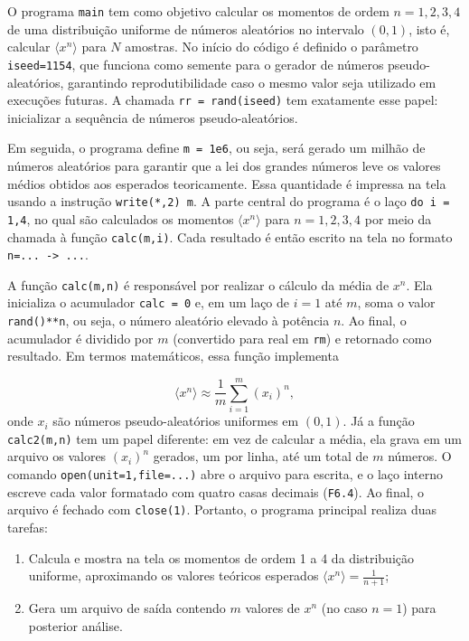 O programa \texttt{main} tem como objetivo calcular os momentos de ordem $n=1,2,3,4$ 
de uma distribuição uniforme de números aleatórios no intervalo $(0,1)$, 
isto é, calcular $\langle x^n \rangle$ para $N$ amostras.  
No início do código é definido o parâmetro \texttt{iseed=1154}, 
que funciona como semente para o gerador de números pseudo-aleatórios, 
garantindo reprodutibilidade caso o mesmo valor seja utilizado em execuções futuras. 
A chamada \texttt{rr = rand(iseed)} tem exatamente esse papel: inicializar a sequência 
de números pseudo-aleatórios.  

Em seguida, o programa define \texttt{m = 1e6}, ou seja, será gerado um milhão de números
aleatórios para garantir que a lei dos grandes números leve os valores médios obtidos
aos esperados teoricamente. Essa quantidade é impressa na tela usando a instrução 
\texttt{write(*,2) m}.  
A parte central do programa é o laço \texttt{do i = 1,4}, no qual são calculados os momentos
$\langle x^n \rangle$ para $n=1,2,3,4$ por meio da chamada à função \texttt{calc(m,i)}. 
Cada resultado é então escrito na tela no formato \texttt{n=... -> ...}.  

A função \texttt{calc(m,n)} é responsável por realizar o cálculo da média de $x^n$. 
Ela inicializa o acumulador \texttt{calc = 0} e, em um laço de $i=1$ até $m$, 
soma o valor \texttt{rand()**n}, ou seja, o número aleatório elevado à potência $n$. 
Ao final, o acumulador é dividido por $m$ (convertido para real em \texttt{rm}) e 
retornado como resultado. Em termos matemáticos, essa função implementa

\begin{equation}
  \langle x^n \rangle \approx \frac{1}{m}\sum_{i=1}^{m} (x_i)^n,
\end{equation}
\noindent
onde $x_i$ são números pseudo-aleatórios uniformes em $(0,1)$.  
Já a função \texttt{calc2(m,n)} tem um papel diferente: em vez de calcular a média,
ela grava em um arquivo os valores $(x_i)^n$ gerados, 
um por linha, até um total de $m$ números. O comando \texttt{open(unit=1,file=...)} 
abre o arquivo para escrita, e o laço interno escreve cada valor formatado com 
quatro casas decimais (\texttt{F6.4}). Ao final, o arquivo é fechado com 
\texttt{close(1)}.  Portanto, o programa principal realiza duas tarefas:  

\begin{enumerate}[label=(\roman*)]
  \item Calcula e mostra na tela os momentos de ordem 1 a 4 da distribuição uniforme, 
aproximando os valores teóricos esperados $\langle x^n \rangle = \frac{1}{n+1}$;  
  \item Gera um arquivo de saída contendo $m$ valores de $x^n$ (no caso $n=1$) 
para posterior análise.  

\end{enumerate}


